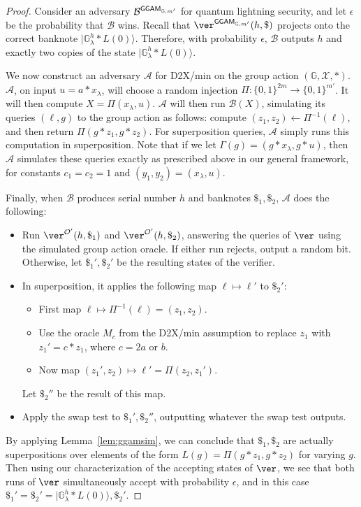 \documentclass{article}\usepackage[a4paper,margin=20mm]{geometry}
\numberwithin{theorem}{section}
\numberwithin{equation}{section}
\newcommand{\G}{\mathbb{G}}
\newcommand{\As}{{\mathcal{A}}}
\newcommand{\Bs}{{\mathcal{B}}}
\newcommand{\Os}{{\mathcal{O}}}
\newcommand{\Xs}{{\mathcal{X}}}
\newcommand{\GGAM}{{\sf GGAM}}
\begin{document}
\begin{proof}Consider an adversary $\Bs^{\GGAM_{\G,m'}}$ for quantum lightning security, and let $\epsilon$ be the probability that $\Bs$ wins. Recall that $\ver^{\GGAM_{\G,m'}}(h,\$)$ projects onto the correct banknote $|\G^h_\lambda*L(0)\rangle$. Therefore, with probability $\epsilon$, $\Bs$ outputs $h$ and exactly two copies of the state $|\G^h_\lambda*L(0)\rangle$.
	
	We now construct an adversary $\As$ for D2X/min on the group action $(\G,\Xs,*)$. $\As$, on input $u=a*x_\lambda$, will choose a random injection $\Pi:\{0,1\}^{2m}\rightarrow\{0,1\}^{m'}$. It will then compute $X=\Pi(x_\lambda,u)$. $\As$ will then run $\Bs(X)$, simulating its queries $(\ell,g)$ to the group action as follows: compute $(z_1,z_2)\gets\Pi^{-1}(\ell)$, and then return $\Pi(g*z_1,g*z_2)$. For superposition queries, $\As$ simply runs this computation in superposition. Note that if we let $\Gamma(g)=(g*x_\lambda,g*u)$, then $\As$ simulates these queries exactly as prescribed above in our general framework, for constants $c_1=c_2=1$ and $(y_1,y_2)=(x_\lambda,u)$.
	
	Finally, when $\Bs$ produces serial number $h$ and banknotes $\$_1,\$_2$, $\As$ does the following:
	\begin{itemize}
		\item Run $\ver^{\Os'}(h,\$_1)$ and $\ver^{\Os'}(h,\$_2)$, answering the queries of $\ver$ using the simulated group action oracle. If either run rejects, output a random bit. Otherwise, let $\$_1',\$_2'$ be the resulting states of the verifier.
		\item In superposition, it applies the following map $\ell\mapsto\ell'$ to $\$_2'$:
		\begin{itemize}
			\item First map $\ell\mapsto\Pi^{-1}(\ell)=(z_1,z_2)$.
			\item Use the oracle $M_c$ from the D2X/min assumption to replace $z_1$ with $z_1'=c*z_1$, where $c=2a$ or $b$.
			\item Now map $(z_1',z_2)\mapsto\ell'=\Pi(z_2,z_1')$.
		\end{itemize}
		Let $\$_2''$ be the result of this map.
		\item Apply the swap test to $\$_1',\$_2''$, outputting whatever the swap test outputs.
	\end{itemize}
	
	By applying Lemma~\ref{lem:ggamsim}, we can conclude that $\$_1,\$_2$ are actually superpositions over elements of the form $L(g)=\Pi(g*z_1,g*z_2)$ for varying $g$. Then using our characterization of the accepting states of $\ver$, we see that both runs of $\ver$ simultaneously accept with probability $\epsilon$, and in this case $\$_1'=\$_2'=|\G_\lambda^h*L(0)\rangle,\$_2'$.
	

\end{proof}
\end{document}
